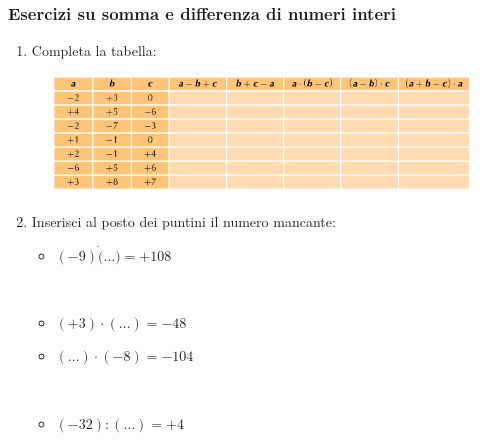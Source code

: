 \documentclass[handout]{beamer}
\theoremstyle{plain}
\begin{document}
\begin{frame}
\frametitle{Esercizi su somma e differenza di numeri interi}
\begin{enumerate}\setcounter{enumi}{0}
  \item Completa la tabella:
\end{enumerate}
\begin{figure}
  \includegraphics[width=\columnwidth]{img/eseinteri1.png}
\end{figure}
\begin{enumerate}\setcounter{enumi}{1}
  \item Inserisci al posto dei puntini il numero mancante:
  \begin{multicols}{2}
    \begin{itemize}
      \item $ (-9) \dot (\ldots) = +108 $
      
      ~
      \item $ (+3) \cdot (\ldots) = -48 $
      \item $ (\ldots) \cdot (-8) = -104 $
      
      ~
      \item $ (-32) : (\ldots) = +4 $
    \end{itemize}
  \end{multicols}
\end{enumerate}
\end{frame}
\end{document}

